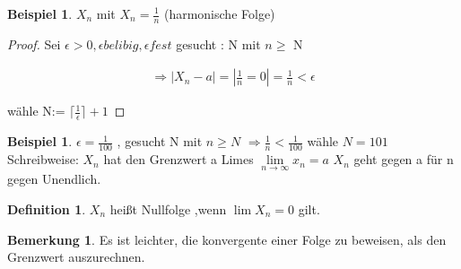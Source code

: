 \documentclass[a4paper,12pt,leqno]{report}
\theoremstyle{plain} %
\theoremstyle{definition} %
\newtheorem{remark}[theorem]{Bemerkung}
\newtheorem{definition}[theorem]{Definition}
\newtheorem{example}[theorem]{Beispiel}
\begin{document}
\begin{example}

$X_n$ mit $X_n = \frac{1}{n}$ (harmonische Folge)

\end{example}

\begin{proof}
Sei $\epsilon > 0 , \epsilon belibig , \epsilon fest$
gesucht : N mit $n \geq$ N

\begin{gather}
\Rightarrow |X_n-a|= |\frac{1}{n} =0|=\frac{1}{n}<\epsilon
\end{gather}

wähle N:= $\lceil \frac{1}{\epsilon} \rceil +1$

\end{proof}

\begin{example}
$\epsilon = \frac{1}{100}$ , gesucht N mit $n \geq N$
$\Rightarrow \frac{1}{n} < \frac{1}{100}$ wähle $N=101$\\


Schreibweise: $X_n$ hat den Grenzwert a Limes
$\lim\limits_{n \rightarrow \infty}{x_n}=a$
$X_n$ geht gegen a für n gegen Unendlich.
\end{example}

\begin{definition}
$X_n$ heißt Nullfolge ,wenn $\lim\limits{X_n}=0$ gilt.
\end{definition}

\begin{remark}

Es ist leichter, die konvergente einer Folge zu beweisen, als den Grenzwert auszurechnen.

\end{remark}
\end{document}
